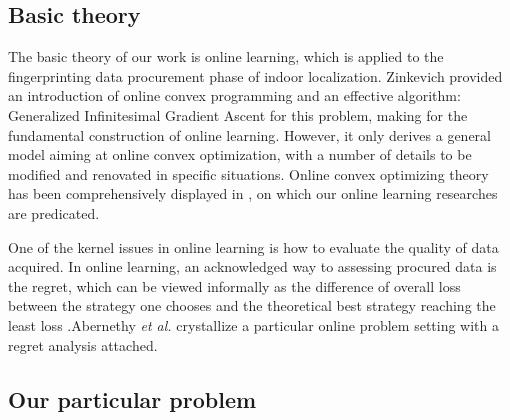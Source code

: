 \documentclass[10pt,conference,compsocconf,letterpaper]{IEEEtran}
\begin{document}
\subsection{Basic theory}

The basic theory of our work is online learning, which is applied to the fingerprinting data procurement phase of indoor localization. Zinkevich provided an introduction of online convex programming and an effective algorithm: Generalized Infinitesimal Gradient Ascent for this problem, making for the fundamental construction of online learning\cite{zinkevich2003online}. However, it only derives a general model aiming at online convex optimization, with a number of details to be modified and renovated in specific situations. Online convex optimizing theory has been comprehensively displayed in \cite{shalev2011online}, on which our online learning researches are predicated.

One of the kernel issues in online learning is how to evaluate the quality of data acquired. In online learning, an acknowledged way to assessing procured data is the regret, which can be viewed informally as the difference of overall loss between the strategy one chooses and the theoretical best strategy reaching the least loss \cite{shalev2011online}.Abernethy \emph{et al.} crystallize a particular online problem setting with a regret analysis attached\cite{abernethy2015low}.

\subsection{Our particular problem}
\end{document}
